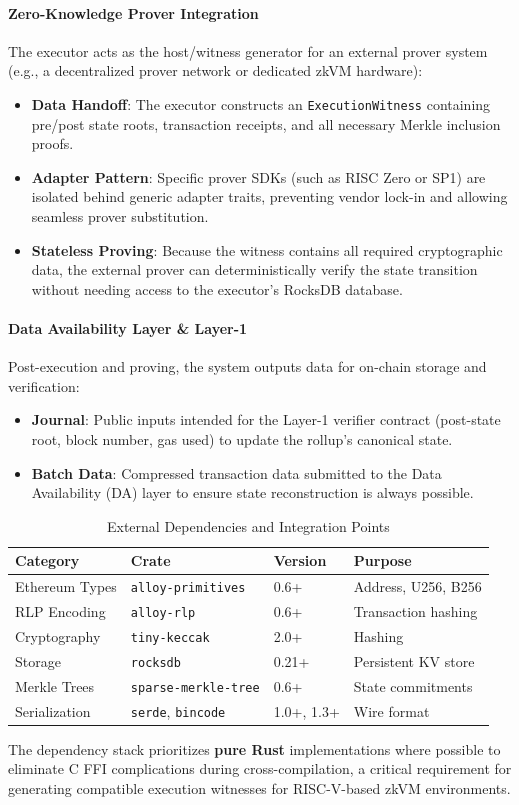 \paragraph{Zero-Knowledge Prover Integration}
The executor acts as the host/witness generator for an external prover system (e.g., a decentralized prover network or dedicated zkVM hardware):
\begin{itemize}[leftmargin=*]
    \item \textbf{Data Handoff}: The executor constructs an \texttt{ExecutionWitness} containing pre/post state roots, transaction receipts, and all necessary Merkle inclusion proofs.
    \item \textbf{Adapter Pattern}: Specific prover SDKs (such as RISC Zero or SP1) are isolated behind generic adapter traits, preventing vendor lock-in and allowing seamless prover substitution.
    \item \textbf{Stateless Proving}: Because the witness contains all required cryptographic data, the external prover can deterministically verify the state transition without needing access to the executor's RocksDB database.
\end{itemize}

\paragraph{Data Availability Layer \& Layer-1}
Post-execution and proving, the system outputs data for on-chain storage and verification:
\begin{itemize}[leftmargin=*]
    \item \textbf{Journal}: Public inputs intended for the Layer-1 verifier contract (post-state root, block number, gas used) to update the rollup's canonical state.
    \item \textbf{Batch Data}: Compressed transaction data submitted to the Data Availability (DA) layer to ensure state reconstruction is always possible.
\end{itemize}

\begin{table}[H]
\centering
\caption{External Dependencies and Integration Points}
\label{tab:dependencies}
\begin{tabular}{@{}llll@{}}
\toprule
\textbf{Category} & \textbf{Crate} & \textbf{Version} & \textbf{Purpose} \\
\midrule
Ethereum Types & \texttt{alloy-primitives} & 0.6+ & Address, U256, B256 \\
RLP Encoding & \texttt{alloy-rlp} & 0.6+ & Transaction hashing \\
Cryptography & \texttt{tiny-keccak} & 2.0+ & Hashing \\
Storage & \texttt{rocksdb} & 0.21+ & Persistent KV store \\
Merkle Trees & \texttt{sparse-merkle-tree} & 0.6+ & State commitments \\
Serialization & \texttt{serde}, \texttt{bincode} & 1.0+, 1.3+ & Wire format \\
\bottomrule
\end{tabular}
\end{table}

The dependency stack prioritizes \textbf{pure Rust} implementations where possible to eliminate C FFI complications during cross-compilation, a critical requirement for generating compatible execution witnesses for RISC-V-based zkVM environments.
